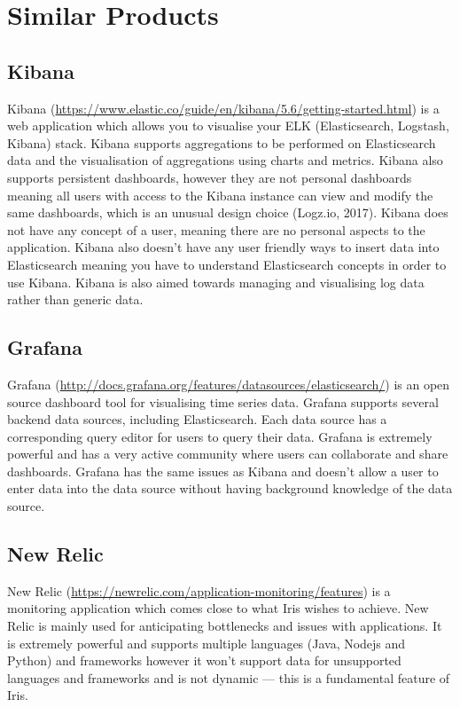 \documentclass[12pt,a4paper,titlepage]{report}
\begin{document}
\section{Similar Products}
\subsection{Kibana}

Kibana (\url{https://www.elastic.co/guide/en/kibana/5.6/getting-started.html}) is a web application which allows you to visualise your ELK (Elasticsearch, Logstash, Kibana) stack. Kibana supports aggregations to be performed on Elasticsearch data and the visualisation of aggregations using charts and metrics. Kibana also supports persistent dashboards, however they are not personal dashboards meaning all users with access to the Kibana instance can view and modify the same dashboards, which is an unusual design choice (Logz.io, 2017). Kibana does not have any concept of a user, meaning there are no personal aspects to the application. Kibana also doesn’t have any user friendly ways to insert data into Elasticsearch meaning you have to understand Elasticsearch concepts in order to use Kibana. Kibana is also aimed towards managing and visualising log data rather than generic data. 

\subsection{Grafana}

Grafana (\url{http://docs.grafana.org/features/datasources/elasticsearch/}) is an open source dashboard tool for visualising time series data. Grafana supports several backend data sources, including Elasticsearch. Each data source has a corresponding query editor for users to query their data. Grafana is extremely powerful and has a very active community where users can collaborate and share dashboards. Grafana has the same issues as Kibana and doesn’t allow a user to enter data into the data source without having background knowledge of the data source.

\subsection{ New Relic}

New Relic (\url{https://newrelic.com/application-monitoring/features}) is a monitoring application which comes close to what Iris wishes to achieve. New Relic is mainly used for anticipating bottlenecks and issues with applications. It is extremely powerful and supports multiple languages (Java, Nodejs and Python) and frameworks however it won’t support data for unsupported languages and frameworks and is not dynamic — this is a fundamental feature of Iris.
\end{document}
